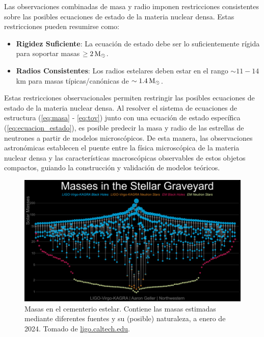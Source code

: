 Las observaciones combinadas de masa y radio imponen restricciones consistentes sobre las posibles ecuaciones de estado de la materia nuclear densa. Estas restricciones pueden resumirse como:

\begin{itemize}
	\item \textbf{Rigidez Suficiente}: La ecuación de estado debe ser lo suficientemente rígida para soportar masas $\geq 2 \,\text{M}_\odot$.
	
	\item \textbf{Radios Consistentes}: Los radios estelares deben estar en el rango $\sim 11-14$ km para masas típicas/canónicas de $\sim 1.4 \,\text{M}_\odot$.
\end{itemize}

Estas restricciones observacionales permiten restringir las posibles ecuaciones de estado de la materia nuclear densa. Al resolver el sistema de ecuaciones de estructura (\ref{eq:masa} - \ref{eq:tov}) junto con una ecuación de estado específica (\ref{eq:ecuacion_estado}), es posible predecir la masa y radio de las estrellas de neutrones a partir de modelos microscópicos. De esta manera, las observaciones astronómicas establecen el puente entre la física microscópica de la materia nuclear densa y las características macroscópicas observables de estos objetos compactos, guiando la construcción y validación de modelos teóricos.

\begin{figure}[h]
	\centering
	\includegraphics[width=0.7\linewidth]{Figuras/ligo-virgo-graveyard}
	\caption{Masas en el cementerio estelar. Contiene las masas estimadas mediante diferentes fuentes y su (posible) naturaleza, a enero de 2024. Tomado de \href{https://www.ligo.caltech.edu/image/ligo20250826d}{ligo.caltech.edu}.}
	\label{fig:ligo-virgo-graveyard}
\end{figure}

